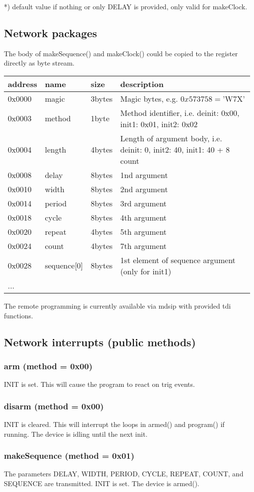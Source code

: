 \documentclass{article}
\begin{document}
*) default value if nothing or only DELAY is provided, only valid for makeClock.

\subsection*{Network packages}
The body of makeSequence() and makeClock() could be copied to the register directly as byte stream.\\
\begin{tabular}{llll}
address&name&size&description\\\hline
0x0000&magic&3bytes&Magic bytes, e.g. $0x573758=$'W7X'\\
0x0003&method&1byte&Method identifier, i.e. deinit: 0x00, init1: 0x01, init2: 0x02\\
0x0004&length&4bytes&Length of argument body, i.e. deinit: 0, init2: 40, init1: 40 + 8 count\\
0x0008&delay&8bytes&1nd argument\\
0x0010&width&8bytes&2nd argument\\
0x0014&period&8bytes&3rd argument\\
0x0018&cycle&8bytes&4th argument\\
0x0020&repeat&4bytes&5th argument\\
0x0024&count&4bytes&7th argument\\
0x0028&sequence[0]&8bytes&1st element of sequence argument (only for init1)\\
...
\end{tabular}

The remote programming is currently available via mdsip with provided tdi functions.

\subsection*{Network interrupts (public methods)}
\subsubsection*{arm (method = 0x00)}
INIT is set. This will cause the program to react on trig events.
\subsubsection*{disarm (method = 0x00)}
INIT is cleared. This will interrupt the loops in armed() and program() if running. The device is idling until the next init.
\subsubsection*{makeSequence (method = 0x01)}
The parameters DELAY, WIDTH, PERIOD, CYCLE, REPEAT, COUNT, and SEQUENCE are transmitted. INIT is set. The device is armed().
\end{document}

